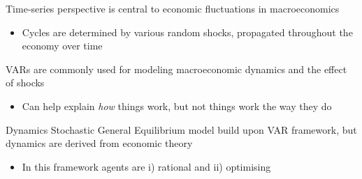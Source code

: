 \documentclass{beamer}
\begin{document}
\begin{frame}
 Time-series perspective is central to economic fluctuations in macroeconomics
 \begin{itemize}
   \item Cycles are determined by various random shocks, propagated throughout the economy over time
 \end{itemize}
 \medskip
 VARs are commonly used for modeling macroeconomic dynamics and the effect of shocks
 \begin{itemize}
   \item Can help explain \textit{how} things work, but not  things work the way they do   
 \end{itemize}
 \medskip
 Dynamics Stochastic General Equilibrium model build upon VAR framework, but dynamics are derived from economic theory
 \begin{itemize}
   \item In this framework agents are i) rational and ii) optimising
 \end{itemize}
\end{frame}








\end{document}
